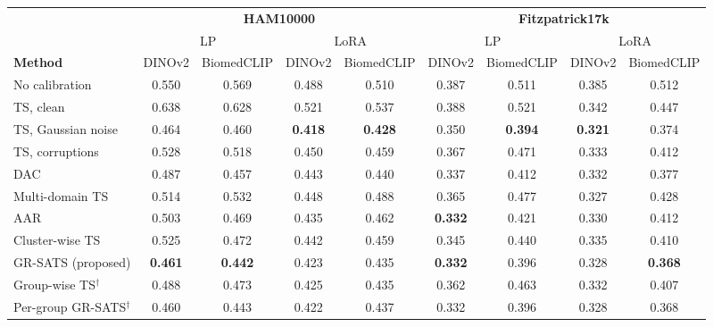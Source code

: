 \begin{tabular}{@{}lcccccccc@{}}
\toprule
 & \multicolumn{4}{c}{\textbf{HAM10000}} & \multicolumn{4}{c}{\textbf{Fitzpatrick17k}} \\
\cmidrule(lr){2-5}\cmidrule(l){6-9}
 & \multicolumn{2}{c}{LP} & \multicolumn{2}{c}{LoRA} & \multicolumn{2}{c}{LP} & \multicolumn{2}{c}{LoRA} \\
\cmidrule(lr){2-3}\cmidrule(lr){4-5}\cmidrule(lr){6-7}\cmidrule(l){8-9}
\textbf{Method} & DINOv2 & BiomedCLIP & DINOv2 & BiomedCLIP & DINOv2 & BiomedCLIP & DINOv2 & BiomedCLIP \\
\midrule
No calibration & 0.550 & 0.569 & 0.488 & 0.510 & 0.387 & 0.511 & 0.385 & 0.512 \\
TS, clean & 0.638 & 0.628 & 0.521 & 0.537 & 0.388 & 0.521 & 0.342 & 0.447 \\
TS, Gaussian noise & 0.464 & 0.460 & \textbf{0.418} & \textbf{0.428} & 0.350 & \textbf{0.394} & \textbf{0.321} & 0.374 \\
TS, corruptions & 0.528 & 0.518 & 0.450 & 0.459 & 0.367 & 0.471 & 0.333 & 0.412 \\
DAC & 0.487 & 0.457 & 0.443 & 0.440 & 0.337 & 0.412 & 0.332 & 0.377 \\
Multi-domain TS & 0.514 & 0.532 & 0.448 & 0.488 & 0.365 & 0.477 & 0.327 & 0.428 \\
AAR & 0.503 & 0.469 & 0.435 & 0.462 & \textbf{0.332} & 0.421 & 0.330 & 0.412 \\
Cluster-wise TS & 0.525 & 0.472 & 0.442 & 0.459 & 0.345 & 0.440 & 0.335 & 0.410 \\
GR-SATS (proposed) & \textbf{0.461} & \textbf{0.442} & 0.423 & 0.435 & \textbf{0.332} & 0.396 & 0.328 & \textbf{0.368} \\
\midrule
Group-wise TS$^\dagger$ & 0.488 & 0.473 & 0.425 & 0.435 & 0.362 & 0.463 & 0.332 & 0.407 \\
Per-group GR-SATS$^\dagger$ & 0.460 & 0.443 & 0.422 & 0.437 & 0.332 & 0.396 & 0.328 & 0.368 \\
\bottomrule
\end{tabular}

